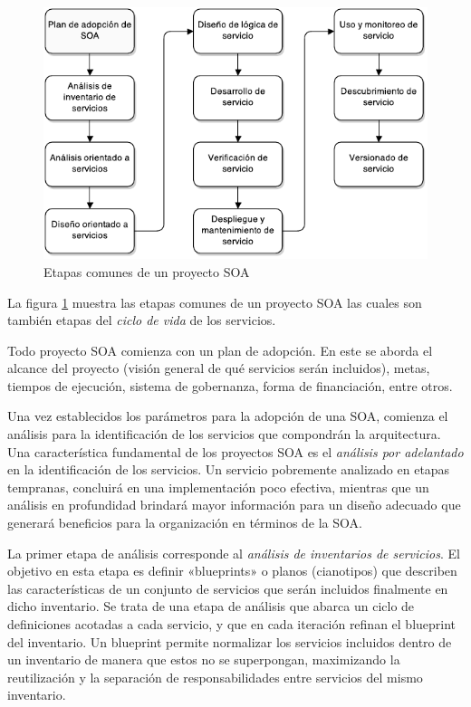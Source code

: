 \documentclass[11pt]{article}
\begin{document}
		\begin{figure}[h]
			\centering
			\includegraphics[width=\linewidth]{ciclo_de_vida_del_proyecto}
			\caption{Etapas comunes de un proyecto SOA}
			\label{figura:ciclo_de_vida_del_proyecto}
		\end{figure}

		La figura \ref{figura:ciclo_de_vida_del_proyecto} muestra las etapas comunes de un proyecto SOA las cuales son también etapas del \emph{ciclo de vida} de los servicios.

		Todo proyecto SOA comienza con un plan de adopción. En este se aborda el alcance del proyecto (visión general de qué servicios serán incluidos), metas, tiempos de ejecución, sistema de gobernanza, forma de financiación, entre otros.

		Una vez establecidos los parámetros para la adopción de una SOA, comienza el análisis para la identificación de los servicios que compondrán la arquitectura. Una característica fundamental de los proyectos SOA es el \emph{análisis por adelantado} en la identificación de los servicios. Un servicio pobremente analizado en etapas tempranas, concluirá en una implementación poco efectiva, mientras que un análisis en profundidad brindará mayor información para un diseño adecuado que generará beneficios para la organización en términos de la SOA.

		La primer etapa de análisis corresponde al \emph{análisis de inventarios de servicios}. El objetivo en esta etapa es definir «blueprints» o planos (cianotipos) que describen las características de un conjunto de servicios que serán incluidos finalmente en dicho inventario. Se trata de una etapa de análisis que abarca un ciclo de definiciones acotadas a cada servicio, y que en cada iteración refinan el blueprint del inventario. Un blueprint permite normalizar los servicios incluidos dentro de un inventario de manera que estos no se superpongan, maximizando la reutilización y la separación de responsabilidades entre servicios del mismo inventario. \cite{Erl:2011:SGG:1983453}
\end{document}
